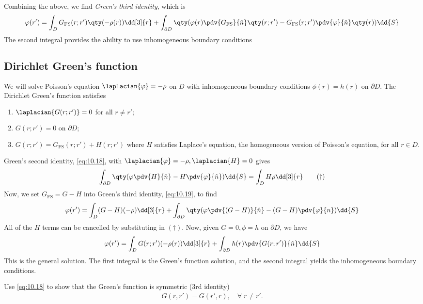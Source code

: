 Combining the above, we find \textit{Green's third identity}, which is
\begin{align} \label{eq:10.19}
	\phi(r') = \int_D G_{\mathrm{FS}}(r;r')  \qty(-\rho(r)) \dd[3]{r} + \int_{\partial D} \qty(\phi(r) \pdv{G_{\mathrm{FS}}}{\hat n} \qty(r;r') - G_{\mathrm{FS}}(r;r') \pdv{\phi}{\hat n}\qty(r)) \dd{S}
\end{align}
The second integral provides the ability to use inhomogeneous boundary conditions

\subsection{Dirichlet Green's function}
We will solve Poisson's equation $\laplacian{\phi} = -\rho$ on $D$ with inhomogeneous boundary conditions $\phi(r) = h(r)$ on $\partial D$.
The Dirichlet Green's function satisfies
\begin{enumerate}
	\item $\laplacian{G(r;r')} = 0$ for all $r \neq r'$;
	\item $G(r;r') = 0$ on $\partial D$;
	\item $G(r;r') = G_{\mathrm{FS}}(r;r') + H(r;r')$ where $H$ satisfies Laplace's equation, the homogeneous version of Poisson's equation, for all $r \in D$.
\end{enumerate}
Green's second identity, \cref{eq:10.18}, with $\laplacian{\phi} = -\rho, \laplacian{H} = 0$ gives
\begin{align*}
	\int_{\partial D} \qty(\phi \pdv{H}{\hat n} - H \pdv{\phi}{\hat n}) \dd{S} = \int_D H \rho \dd[3]{r} \tag{$\dagger$}
\end{align*}
Now, we set $G_{\mathrm{FS}} = G - H$ into Green's third identity, \cref{eq:10.19}, to find
\begin{align*}
	\phi(r') = \int_D (G - H)(-\rho) \dd[3]{r} + \int_{\partial D} \qty(\phi \pdv{(G - H)}{\hat n} - (G-H) \pdv{\phi}{n}) \dd{S}
\end{align*}
All of the $H$ terms can be cancelled by substituting in $(\dagger)$.
Now, given $G = 0, \phi = h$ on $\partial D$, we have
\begin{align} \label{eq:10.20}
	\phi(r') = \int_D G(r;r')(-\rho(r)) \dd[3]{r} + \int_{\partial D} h(r) \pdv{G(r;r')}{\hat n} \dd{S}
\end{align}
This is the general solution.
The first integral is the Green's function solution, and the second integral yields the inhomogeneous boundary conditions.

\begin{exercise}
	Use \cref{eq:10.18} to show that the Green's function is symmetric (3rd identity)
	\begin{align*}
		G(r, r') = G(r', r),\quad \forall \; r \neq r'.
	\end{align*} 
\end{exercise} 

